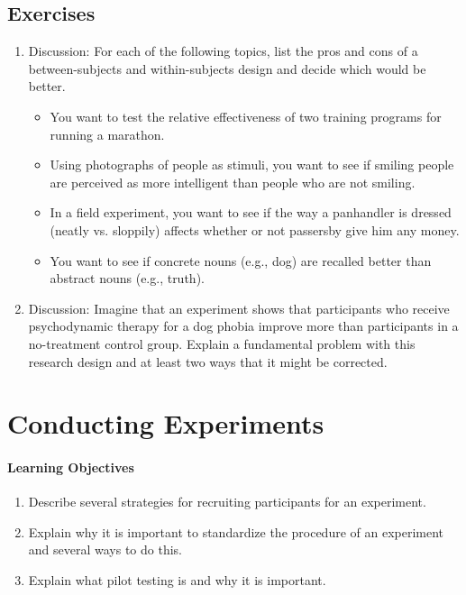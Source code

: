 \subsection{Exercises}
\begin{fullwidth}
\begin{enumerate}
\item  Discussion: For each of the following topics, list the pros and cons of a between-subjects and within-subjects design and decide which would be better.
	\begin{itemize}
	\item You want to test the relative effectiveness of two training programs for running a marathon.
	\item Using photographs of people as stimuli, you want to see if smiling people are perceived as more intelligent than people who are not smiling.
	\item In a field experiment, you want to see if the way a panhandler is dressed (neatly vs. sloppily) affects whether or not passersby give him any money.
	\item You want to see if concrete nouns (e.g., dog) are recalled better than abstract nouns (e.g., truth).

	\end{itemize}
\item Discussion: Imagine that an experiment shows that participants who receive psychodynamic therapy for a dog phobia improve more than participants in a no-treatment control group. Explain a fundamental problem with this research design and at least two ways that it might be corrected.
\end{enumerate}
\end{fullwidth}

\newpage
\section{Conducting Experiments}


  \paragraph{Learning Objectives}
  \begin{enumerate}
  \item Describe several strategies for recruiting participants for an experiment.
  \item Explain why it is important to standardize the procedure of an experiment and several ways to do this.
  \item Explain what pilot testing is and why it is important.
   \end{enumerate}


